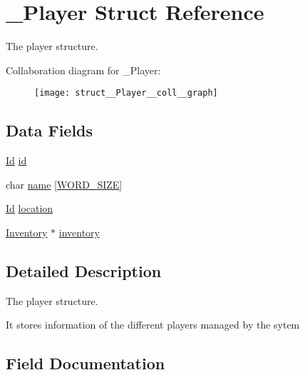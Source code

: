 \hypertarget{struct__Player}{}\section{\+\_\+\+Player Struct Reference}
\label{struct__Player}


The player structure.  




Collaboration diagram for \+\_\+\+Player\+:\nopagebreak
\begin{figure}[H]
\begin{center}
\leavevmode
\texttt{[image: struct\_\_Player\_\_coll\_\_graph]}
\end{center}
\end{figure}
\subsection*{Data Fields}
\begin{DoxyCompactItemize}
\item 
\hyperlink{types_8h_a845e604fb28f7e3d97549da3448149d3}{Id} \hyperlink{struct__Player_a60d635cd063816a9c1bd873f4868bb90}{id}
\item 
char \hyperlink{struct__Player_adda99df91c28eb58d392f2b43fc6898f}{name} \mbox{[}\hyperlink{types_8h_a92ed8507d1cd2331ad09275c5c4c1c89}{W\+O\+R\+D\+\_\+\+S\+I\+ZE}\mbox{]}
\item 
\hyperlink{types_8h_a845e604fb28f7e3d97549da3448149d3}{Id} \hyperlink{struct__Player_adbb6195d15b88f3f658e74274eff52d8}{location}
\item 
\hyperlink{inventory_8h_a2253bf64ac4ce6a9c1d6f39c0b0d32a3}{Inventory} $\ast$ \hyperlink{struct__Player_a5e02924cb82ca61f74ba414d190aa29b}{inventory}
\end{DoxyCompactItemize}


\subsection{Detailed Description}
The player structure. 

It stores information of the different players managed by the sytem 

\subsection{Field Documentation}
\mbox{\label{struct__Player_a60d635cd063816a9c1bd873f4868bb90}} 
